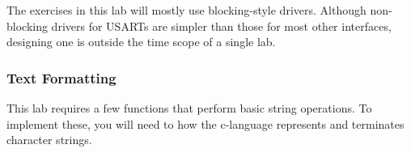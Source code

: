 \documentclass[11pt,fleqn]{book} %
\begin{document}
The exercises in this lab will mostly use blocking-style drivers. Although non-blocking drivers for USARTs are simpler than those for most other interfaces, designing one is outside the time scope of a single lab. 
%
%
%


\subsubsection{Text Formatting}
This lab requires a few functions that perform basic string operations. To implement these, you will need to how the c-language represents and terminates character strings. 
\end{document}
